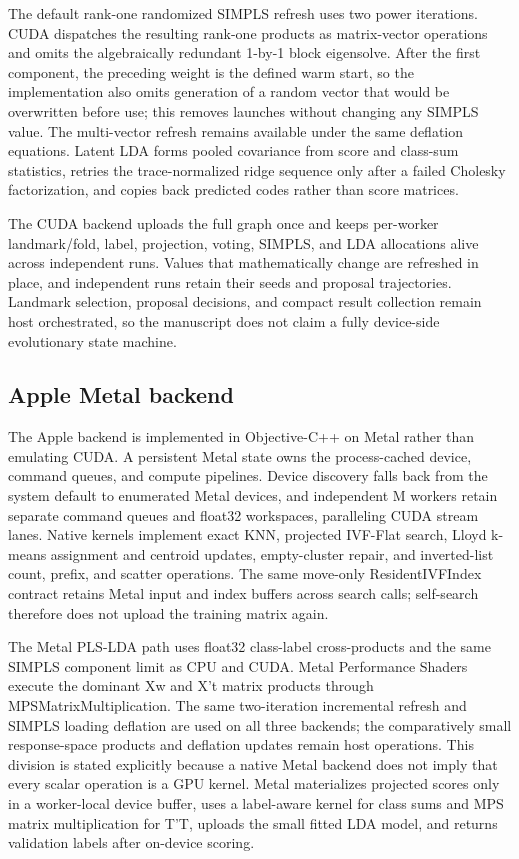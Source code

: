 \documentclass[twoside,11pt]{article}
\begin{document}
\begin{small}
The default rank-one randomized SIMPLS refresh uses two power iterations. CUDA dispatches the resulting rank-one products as matrix-vector operations and omits the algebraically redundant 1-by-1 block eigensolve. After the first component, the preceding weight is the defined warm start, so the implementation also omits generation of a random vector that would be overwritten before use; this removes launches without changing any SIMPLS value. The multi-vector refresh remains available under the same deflation equations. Latent LDA forms pooled covariance from score and class-sum statistics, retries the trace-normalized ridge sequence only after a failed Cholesky factorization, and copies back predicted codes rather than score matrices.

The CUDA backend uploads the full graph once and keeps per-worker landmark/fold, label, projection, voting, SIMPLS, and LDA allocations alive across independent runs. Values that mathematically change are refreshed in place, and independent runs retain their seeds and proposal trajectories. Landmark selection, proposal decisions, and compact result collection remain host orchestrated, so the manuscript does not claim a fully device-side evolutionary state machine.

\subsection{Apple Metal backend}
The Apple backend is implemented in Objective-C++ on Metal rather than emulating CUDA. A persistent Metal state owns the process-cached device, command queues, and compute pipelines. Device discovery falls back from the system default to enumerated Metal devices, and independent M workers retain separate command queues and float32 workspaces, paralleling CUDA stream lanes. Native kernels implement exact KNN, projected IVF-Flat search, Lloyd k-means assignment and centroid updates, empty-cluster repair, and inverted-list count, prefix, and scatter operations. The same move-only ResidentIVFIndex contract retains Metal input and index buffers across search calls; self-search therefore does not upload the training matrix again.

The Metal PLS-LDA path uses float32 class-label cross-products and the same SIMPLS component limit as CPU and CUDA. Metal Performance Shaders execute the dominant Xw and X't matrix products through MPSMatrixMultiplication. The same two-iteration incremental refresh and SIMPLS loading deflation are used on all three backends; the comparatively small response-space products and deflation updates remain host operations. This division is stated explicitly because a native Metal backend does not imply that every scalar operation is a GPU kernel. Metal materializes projected scores only in a worker-local device buffer, uses a label-aware kernel for class sums and MPS matrix multiplication for T'T, uploads the small fitted LDA model, and returns validation labels after on-device scoring.


\end{small}
\end{document}
